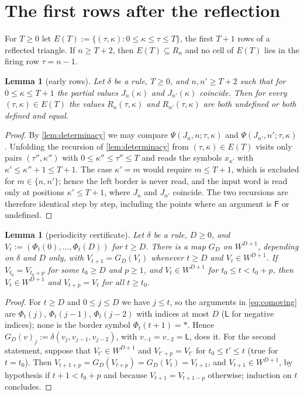 \documentclass[3p]{elsarticle}
\newtheorem{lemma}[theorem]{Lemma}
\theoremstyle{definition}
\newcommand{\Lq}{\mathsf L}
\newcommand{\Fq}{\mathsf F}
\begin{document}
\section{The first rows after the reflection}\label{sec:early}

For $T\ge0$ let $E(T):=\{(\tau,\kappa):0\le\kappa\le\tau\le T\}$, the first
$T+1$ rows of a reflected triangle. If $n\ge T+2$, then $E(T)\subseteq R_n$
and no cell of $E(T)$ lies in the firing row $\tau=n-1$.

\begin{lemma}[early rows]\label{lem:early}
Let $\delta$ be a rule, $T\ge0$, and $n,n'\ge T+2$ such that for $0\le\kappa\le
T+1$ the partial values $J_n(\kappa)$ and $J_{n'}(\kappa)$ coincide. Then for
every $(\tau,\kappa)\in E(T)$ the values $R_n(\tau,\kappa)$ and
$R_{n'}(\tau,\kappa)$ are both undefined or both defined and equal.
\end{lemma}

\begin{proof}
By \cref{lem:determinacy} we may compare $\Psi(J_n,n;\tau,\kappa)$ and
$\Psi(J_{n'},n';\tau,\kappa)$. Unfolding the recursion of
\cref{lem:determinacy} from $(\tau,\kappa)\in E(T)$ visits only pairs
$(\tau'',\kappa'')$ with $0\le\kappa''\le\tau''\le T$ and reads the symbols
$x_{\kappa'}$ with $\kappa'\le\kappa''+1\le T+1$. The case $\kappa'=m$ would
require $m\le T+1$, which is excluded for $m\in\{n,n'\}$; hence the left
border is never read, and the input word is read only at positions
$\kappa'\le T+1$, where $J_n$ and $J_{n'}$ coincide. The two recursions are
therefore identical step by step, including the points where an argument is
$\Fq$ or undefined.
\end{proof}

\begin{lemma}[periodicity certificate]\label{lem:certificate}
Let $\delta$ be a rule, $D\ge0$, and $V_t:=(\Phi_t(0),\dots,\Phi_t(D))$ for
$t\ge D$. There is a map $G_D$ on $W^{D+1}$, depending on $\delta$ and $D$
only, with $V_{t+1}=G_D(V_t)$ whenever $t\ge D$ and $V_t\in W^{D+1}$. If
$V_{t_0}=V_{t_0+p}$ for some $t_0\ge D$ and $p\ge1$, and $V_t\in W^{D+1}$ for
$t_0\le t<t_0+p$, then $V_t\in W^{D+1}$ and $V_{t+p}=V_t$ for all $t\ge t_0$.
\end{lemma}

\begin{proof}
For $t\ge D$ and $0\le j\le D$ we have $j\le t$, so the arguments in
\eqref{eq:comoving} are $\Phi_t(j)$, $\Phi_t(j-1)$, $\Phi_t(j-2)$ with indices
at most $D$ ($\Lq$ for negative indices); none is the border symbol
$\Phi_t(t+1)=\ast$. Hence $G_D(v)_j:=\delta(v_j,v_{j-1},v_{j-2})$, with
$v_{-1}=v_{-2}=\Lq$, does it. For the second statement, suppose that
$V_{t'}\in W^{D+1}$ and $V_{t'+p}=V_{t'}$ for $t_0\le t'\le t$ (true for
$t=t_0$). Then $V_{t+1+p}=G_D(V_{t+p})=G_D(V_t)=V_{t+1}$, and $V_{t+1}\in
W^{D+1}$, by hypothesis if $t+1<t_0+p$ and because $V_{t+1}=V_{t+1-p}$
otherwise; induction on $t$ concludes.
\end{proof}
\end{document}
